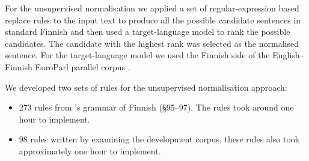 \documentclass[11pt]{article}
\begin{document}
For the unsupervised normalisation we applied a set of regular-expression based 
replace rules to the input text to produce all the possible candidate sentences 
in standard Finnish and then used a target-language model to rank the possible 
candidates. The candidate with the highest rank was selected as the normalised sentence.
For the target-language model we used the Finnish side of the English--Finnish EuroParl
parallel corpus \cite{koehn2005}.

We developed two sets of rules for the unsupervised normalisation approach:

\begin{itemize}
  \item 273 rules from 's grammar of Finnish (\S95--97). The 
    rules took around one hour to implement.
  \item 98 rules written by examining the development corpus, these rules also
    took approximately one hour to implement.
\end{itemize}
\end{document}
